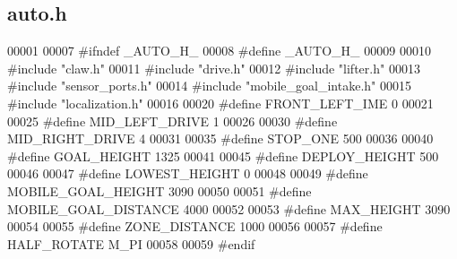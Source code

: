 \subsection{auto.\+h}
\label{auto_8h_source}

\begin{DoxyCode}
00001 
00007 \textcolor{preprocessor}{#ifndef \_AUTO\_H\_}
00008 \textcolor{preprocessor}{#define \_AUTO\_H\_}
00009 
00010 \textcolor{preprocessor}{#include "claw.h"}
00011 \textcolor{preprocessor}{#include "drive.h"}
00012 \textcolor{preprocessor}{#include "lifter.h"}
00013 \textcolor{preprocessor}{#include "sensor_ports.h"}
00014 \textcolor{preprocessor}{#include "mobile_goal_intake.h"}
00015 \textcolor{preprocessor}{#include "localization.h"}
00016 
00020 \textcolor{preprocessor}{#define FRONT\_LEFT\_IME 0}
00021 
00025 \textcolor{preprocessor}{#define MID\_LEFT\_DRIVE 1}
00026 
00030 \textcolor{preprocessor}{#define MID\_RIGHT\_DRIVE 4}
00031 
00035 \textcolor{preprocessor}{#define STOP\_ONE 500}
00036 
00040 \textcolor{preprocessor}{#define GOAL\_HEIGHT 1325}
00041 
00045 \textcolor{preprocessor}{#define DEPLOY\_HEIGHT 500}
00046 
00047 \textcolor{preprocessor}{#define LOWEST\_HEIGHT 0}
00048 
00049 \textcolor{preprocessor}{#define MOBILE\_GOAL\_HEIGHT 3090}
00050 
00051 \textcolor{preprocessor}{#define MOBILE\_GOAL\_DISTANCE 4000}
00052 
00053 \textcolor{preprocessor}{#define MAX\_HEIGHT 3090}
00054 
00055 \textcolor{preprocessor}{#define ZONE\_DISTANCE 1000}
00056 
00057 \textcolor{preprocessor}{#define HALF\_ROTATE M\_PI}
00058 
00059 \textcolor{preprocessor}{#endif}
\end{DoxyCode}
